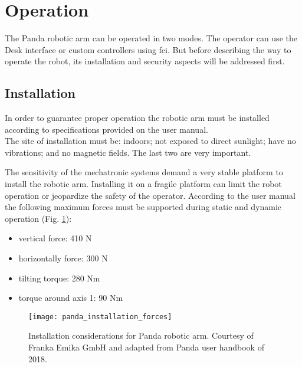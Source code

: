 


\section{Operation}
\label{sec:robotic_system_operation}

The Panda robotic arm can be operated in two modes. The operator can use the Desk interface or custom controllers using \gls{fci}. But before describing the way to operate the robot, its installation and security aspects will be addressed first.

\subsection{Installation}
\label{subsec:robotic_system_operation_installation}

In order to guarantee proper operation the robotic arm must be installed according to specifications provided on the user manual.\\

The site of installation must be: indoors; not exposed to direct sunlight; have no vibrations; and no magnetic fields. The last two are very important. 

The sensitivity of the mechatronic systems demand a very stable platform to install the robotic arm. Installing it on a fragile platform can limit the robot operation or jeopardize the safety of the operator. According to the user manual the following maximum forces must be supported during static and dynamic operation (Fig. \ref{fig:panda_installation_forces}):

\begin{itemize}
    \item vertical force: 410 N
    \item horizontally force: 300 N
    \item tilting torque: 280 Nm
    \item torque around axis 1: 90 Nm
\end{itemize}

\begin{figure}[htbp]
    \centering
	\texttt{[image: panda\_installation\_forces]}
	\caption{Installation considerations for Panda robotic arm. Courtesy of Franka Emika GmbH and adapted from Panda user handbook of 2018.}
	\label{fig:panda_installation_forces}
\end{figure}

